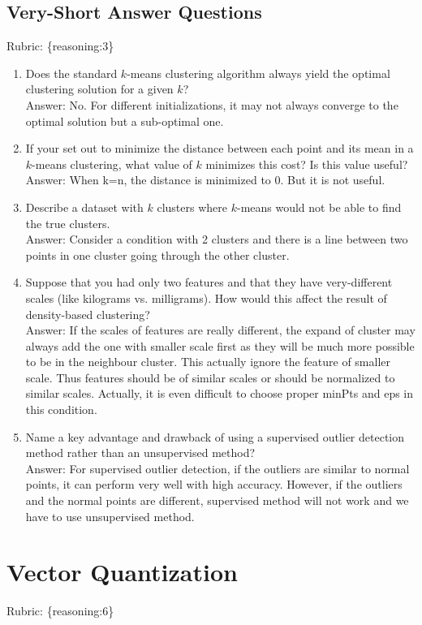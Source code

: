 \documentclass{article}
\def\blu#1{{\color{blu}#1}}
\def\gre#1{{\color{gre}#1}}
\def\enum#1{\begin{enumerate}#1\end{enumerate}}
\def\rubric#1{\gre{Rubric: \{#1\}}}{}
\begin{document}
\subsection{Very-Short Answer Questions}
\rubric{reasoning:3}

\blu{
\enum{
\item Does the standard $k$-means clustering algorithm always yield the optimal clustering solution for a given $k$?
\textcolor{gre}{\\Answer: No. For different initializations, it may not always converge to the optimal solution but a sub-optimal one. }
\item If your set out to minimize the distance between each point and its mean in a $k$-means clustering, what value of $k$ minimizes this cost? Is this value useful?
\textcolor{gre}{\\Answer: When k=n, the distance is minimized to 0. But it is not useful.}
\item Describe a dataset with $k$ clusters where $k$-means would not be able to find the true clusters.
\textcolor{gre}{\\Answer: Consider a condition with 2 clusters and there is a line between two points in one cluster going through the other cluster.}
\item Suppose that you had only two features and that they have very-different scales (like kilograms vs. milligrams). How would this affect the result of density-based clustering?
\textcolor{gre}{\\Answer: If the scales of features are really different, the expand of cluster may always add the one with smaller scale first as they will be much more possible to be in the neighbour cluster. This actually ignore the feature of smaller scale. Thus features should be of similar scales or should be normalized to similar scales. Actually, it is even difficult to choose proper minPts and eps in this condition.}
\item Name a key advantage and drawback of using a supervised outlier detection method rather than an unsupervised method?
\textcolor{gre}{\\Answer: For supervised outlier detection, if the outliers are similar to normal points, it can perform very well with high accuracy. However, if the outliers and the normal points are different, supervised method will not work and we have to use unsupervised method. }
}}



\section{Vector Quantization}
\rubric{reasoning:6}
\end{document}
